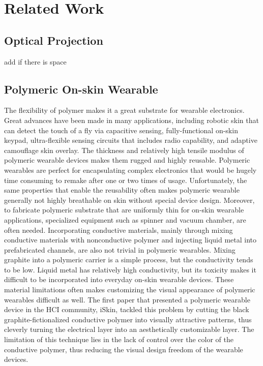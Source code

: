 \documentclass{sigchi}
\begin{document}
\section{Related Work}
\subsection{Optical Projection}
add if there is space
\subsection{Polymeric On-skin Wearable}
The flexibility of polymer makes it a great substrate for wearable electronics. Great advances have been made in many applications, including robotic skin that can detect the touch of a fly via capacitive sensing, fully-functional on-skin keypad, ultra-flexible sensing circuits that includes radio capability, and adaptive camouflage skin overlay. The thickness and relatively high tensile modulus of polymeric wearable devices makes them rugged and highly reusable. Polymeric wearables are perfect for encapsulating complex electronics that would be hugely time consuming to remake after one or two times of usage. Unfortunately, the same properties that enable the reusability often makes polymeric wearable generally not highly breathable on skin without special device design. Moreover, to fabricate polymeric substrate that are uniformly thin for on-skin wearable applications, specialized equipment such as spinner and vacuum chamber, are often needed. Incorporating conductive materials, mainly through mixing conductive materials with nonconductive polymer and injecting liquid metal into prefabricated channels, are also not trivial in polymeric wearables. Mixing graphite into a polymeric carrier is a simple process, but the conductivity tends to be low. Liquid metal has relatively high conductivity, but its toxicity makes it difficult to be incorporated into everyday on-skin wearable devices. These material limitations often makes customizing the visual appearance of polymeric wearables difficult as well. The first paper that presented a polymeric wearable device in the HCI community, iSkin, tackled this problem by cutting the black graphite-fictionalized conductive polymer into visually attractive patterns, thus cleverly turning the electrical layer into an aesthetically customizable layer. The limitation of this technique lies in the lack of control over the color of the conductive polymer, thus reducing the visual design freedom of the wearable devices. 
\end{document}
